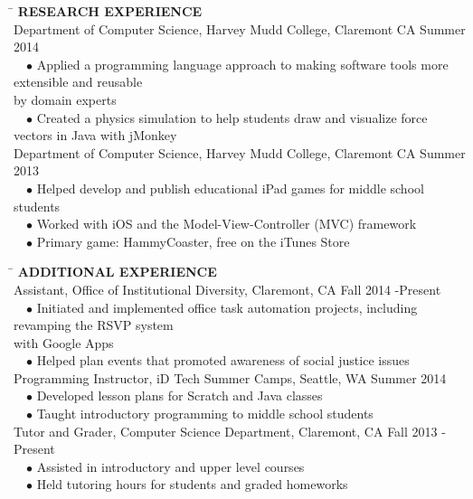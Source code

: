 \documentclass[11pt]{article}
\newcommand{\sectionNL}{\\[-2pt]}
\newcommand{\customtab}{$\hspace{10pt} \bullet \hspace{2pt}$}
\newcommand{\customtabinline}{$\hspace{23pt}$}
\begin{document}
\begin{tabbing} 
\hspace*{6.5in}\= \kill
{\textbf{RESEARCH EXPERIENCE} } \> \sectionNL
Department of Computer Science, Harvey Mudd College, Claremont CA \>Summer 2014 \\
\customtab Applied a programming language approach to making software tools more extensible and reusable \\ by domain experts \\
\customtab Created a physics simulation to help students draw and visualize force vectors in Java with jMonkey\\

Department of Computer Science, Harvey Mudd College, Claremont CA \>Summer 2013 \\
\customtab Helped develop and publish educational iPad games for middle school students \\
\customtab Worked with iOS and the Model-View-Controller (MVC) framework \\
\customtab Primary game: HammyCoaster, free on the iTunes Store
\end{tabbing}


\begin{tabbing} 
\hspace*{6.5in}\= \kill
{\textbf{ADDITIONAL EXPERIENCE } } \> \sectionNL
Assistant, Office of Institutional Diversity, Claremont, CA \>Fall 2014 -Present \\
\customtab Initiated and implemented office task automation projects, including revamping the RSVP system \\ with Google Apps \\
\customtab Helped plan events that promoted awareness of social justice issues \\

Programming Instructor, iD Tech Summer Camps, Seattle, WA \> Summer 2014 \\
\customtab Developed lesson plans for Scratch and Java classes \\
\customtab Taught introductory programming to  middle school students\\

Tutor and Grader, Computer Science Department, Claremont, CA \> Fall 2013 -Present \\ %
\customtab Assisted in introductory and upper level courses \\
\customtab Held tutoring hours for students and graded homeworks
\end{tabbing}
\end{document}
